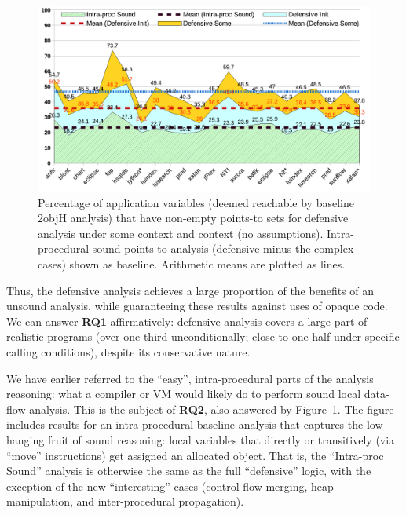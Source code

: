 \begin{figure}[tbh]
\centering
\includegraphics[width=\linewidth]{assets/defensive/vars.pdf}
\caption[Percentage of application variables that have non-empty points-to sets]{Percentage of application variables (deemed reachable by baseline 2objH analysis) that have non-empty points-to sets for defensive analysis under some context and \ctxInit{} context (no assumptions). Intra-procedural sound points-to analysis (defensive minus the complex cases) shown as baseline. Arithmetic means are plotted as lines.}
\label{fig:sound:coverage}
\end{figure}

Thus, the defensive analysis achieves a large proportion of the benefits of an unsound analysis, while guaranteeing these results against uses of opaque code. We can answer \textbf{RQ1} affirmatively: defensive analysis covers a large part of realistic programs (over one-third unconditionally; close to one half under specific calling conditions), despite its conservative nature.


We have earlier referred to the ``easy'', intra-procedural parts of the analysis reasoning: what a compiler or VM would likely do to perform sound local data-flow analysis. This is the subject of \textbf{RQ2}, also answered by Figure~\ref{fig:sound:coverage}. The figure includes results for an intra-procedural baseline analysis that captures the low-hanging fruit of sound reasoning: local variables that directly or transitively (via ``move'' instructions) get assigned an allocated object. That is, the ``Intra-proc Sound'' analysis is otherwise the same as the full ``defensive'' logic, with the exception of the new ``interesting'' cases (control-flow merging, heap manipulation, and inter-procedural propagation). 


